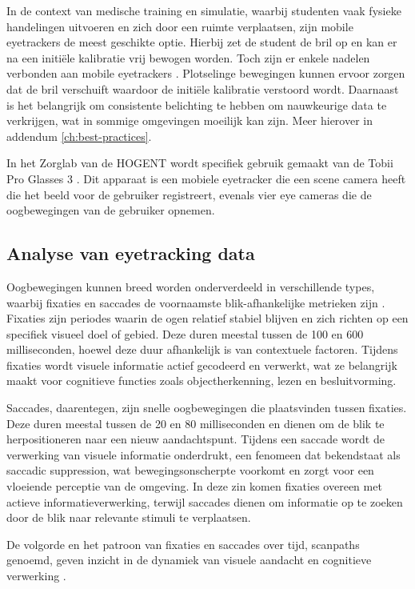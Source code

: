 In de context van medische training en simulatie, waarbij studenten vaak fysieke handelingen uitvoeren en zich door een ruimte verplaatsen, zijn mobile eyetrackers de meest geschikte optie.
Hierbij zet de student de bril op en kan er na een initiële kalibratie vrij bewogen worden.
Toch zijn er enkele nadelen verbonden aan mobile eyetrackers \autocite{Pauszek2023}. 
Plotselinge bewegingen kunnen ervoor zorgen dat de bril verschuift waardoor de initiële kalibratie verstoord wordt.
Daarnaast is het belangrijk om consistente belichting te hebben om nauwkeurige data te verkrijgen, wat in sommige omgevingen moeilijk kan zijn.
Meer hierover in addendum \ref{ch:best-practices}.

In het Zorglab van de HOGENT wordt specifiek gebruik gemaakt van de Tobii Pro Glasses 3 \autocite{Tobii2025a}. 
Dit apparaat is een mobiele eyetracker die een scene camera heeft die het beeld voor de gebruiker registreert, evenals vier eye cameras die de oogbewegingen van de gebruiker opnemen.

\subsection{Analyse van eyetracking data}

Oogbewegingen kunnen breed worden onderverdeeld in verschillende types, waarbij fixaties en saccades de voornaamste blik-afhankelijke metrieken zijn \autocite{Pauszek2023}.
Fixaties zijn periodes waarin de ogen relatief stabiel blijven en zich richten op een specifiek visueel doel of gebied.
Deze duren meestal tussen de 100 en 600 milliseconden, hoewel deze duur afhankelijk is van contextuele factoren.
Tijdens fixaties wordt visuele informatie actief gecodeerd en verwerkt, wat ze belangrijk maakt voor cognitieve functies zoals objectherkenning, lezen en besluitvorming.

Saccades, daarentegen, zijn snelle oogbewegingen die plaatsvinden tussen fixaties.
Deze duren meestal tussen de 20 en 80 milliseconden en dienen om de blik te herpositioneren naar een nieuw aandachtspunt.
Tijdens een saccade wordt de verwerking van visuele informatie onderdrukt, een fenomeen dat bekendstaat als saccadic suppression, wat bewegingsonscherpte voorkomt en zorgt voor een vloeiende perceptie van de omgeving.
In deze zin komen fixaties overeen met actieve informatieverwerking, terwijl saccades dienen om informatie op te zoeken door de blik naar relevante stimuli te verplaatsen.

De volgorde en het patroon van fixaties en saccades over tijd, scanpaths genoemd, geven inzicht in de dynamiek van visuele aandacht en cognitieve verwerking \autocite{Pauszek2023}.

